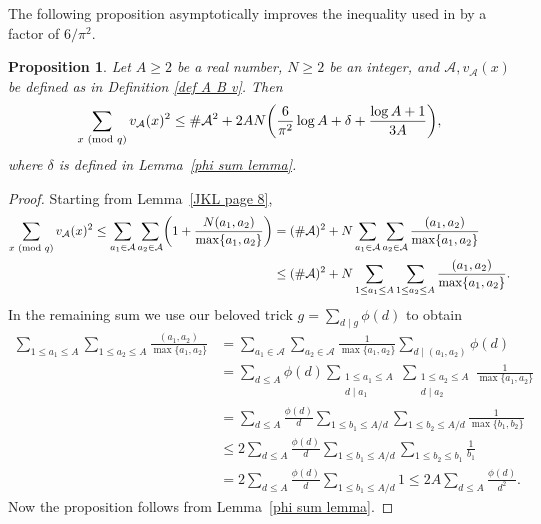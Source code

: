 \documentclass[12pt]{amsart}
\theoremstyle{plain}
\newtheorem{proposition}[theorem]{Proposition}
\theoremstyle{definition}
\newcommand{\cA}{{\mathcal{A}}}
\renewcommand{\pmod}[1]{{\ifmmode\text{\rm\ (mod~$#1$)}\else\discretionary{}{}{\hbox{ }}\rm(mod~$#1$)\fi}}
\begin{document}

The following proposition asymptotically improves the inequality used in \cite{JKL} by a factor of $6/\pi^2$.

\begin{proposition}
\label{real v_A square sum}
Let $A\ge 2$ be a real number, $N\ge2$ be an integer, and $\cA, v_\cA(x)$ be defined as in Definition \ref{def A B v}. Then
$$\displaystyle \sum_{x\pmod q} v_\cA(x)^2 \le \#\cA^2 + 2AN \biggl( \frac6{\pi^2} \log A + \delta + \frac{\log A+1}{3A} \biggr),$$ 
where $\delta$ is defined in Lemma~\ref{phi sum lemma}.
\end{proposition}

\begin{proof}
Starting from Lemma~\ref{JKL page 8},
\begin{align*}
\sum_{x\pmod q} v_\cA(x)^2 \le \sum_{a_1\in\cA} \sum_{a_2\in\cA} \biggl( 1 + \frac{N(a_1,a_2)}{\max\{a_1,a_2\}} \biggr) &= (\#\cA)^2 + N \sum_{a_1\in\cA} \sum_{a_2\in\cA} \frac{(a_1,a_2)}{\max\{a_1,a_2\}} \\
&\le (\#\cA)^2 + N \sum_{1\le a_1\le A} \sum_{1\le a_2\le A} \frac{(a_1,a_2)}{\max\{a_1,a_2\}}.
\end{align*}
In the remaining sum we use our beloved trick $g = \sum_{d\mid g} \phi(d)$ to obtain
\begin{align*}
\sum_{1\le a_1\le A} \sum_{1\le a_2\le A} \frac{(a_1,a_2)}{\max\{a_1,a_2\}} &= \sum_{a_1\in\cA} \sum_{a_2\in\cA} \frac1{\max\{a_1,a_2\}} \sum_{d\mid(a_1,a_2)} \phi(d) \\
&= \sum_{d\le A} \phi(d) \sum_{\substack{1\le a_1\le A \\ d\mid a_1}} \sum_{\substack{1\le a_2\le A \\ d\mid a_2}} \frac1{\max\{a_1,a_2\}} \\
&= \sum_{d\le A} \frac{\phi(d)}d \sum_{1\le b_1\le A/d} \sum_{1\le b_2\le A/d} \frac1{\max\{b_1,b_2\}} \\
&\le 2 \sum_{d\le A} \frac{\phi(d)}d \sum_{1\le b_1\le A/d} \sum_{1\le b_2\le b_1} \frac1{b_1} \\
&= 2 \sum_{d\le A} \frac{\phi(d)}d \sum_{1\le b_1\le A/d} 1 \le 2A \sum_{d\le A} \frac{\phi(d)}{d^2}.
\end{align*}
Now the proposition follows from Lemma~\ref{phi sum lemma}.
\end{proof}
\end{document}
